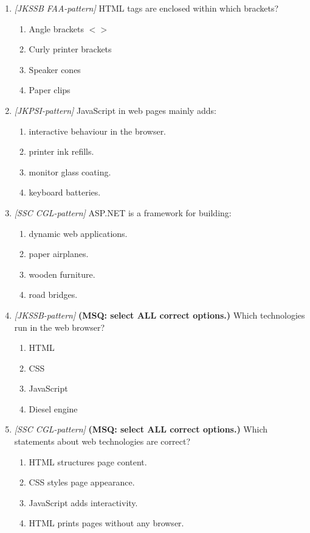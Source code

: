 \begin{enumerate}[label=\textbf{Q\arabic*.}, leftmargin=*]
\item \textit{[JKSSB FAA-pattern]} HTML tags are enclosed within which brackets?
  \begin{enumerate}[label=\Alph*.]
    \item Angle brackets $< >$
    \item Curly printer brackets
    \item Speaker cones
    \item Paper clips
  \end{enumerate}
\item \textit{[JKPSI-pattern]} JavaScript in web pages mainly adds:
  \begin{enumerate}[label=\Alph*.]
    \item interactive behaviour in the browser.
    \item printer ink refills.
    \item monitor glass coating.
    \item keyboard batteries.
  \end{enumerate}
\item \textit{[SSC CGL-pattern]} ASP.NET is a framework for building:
  \begin{enumerate}[label=\Alph*.]
    \item dynamic web applications.
    \item paper airplanes.
    \item wooden furniture.
    \item road bridges.
  \end{enumerate}
\item \textit{[JKSSB-pattern]} \textbf{(MSQ: select ALL correct options.)} Which technologies run in the web browser?
  \begin{enumerate}[label=\Alph*.]
    \item HTML
    \item CSS
    \item JavaScript
    \item Diesel engine
  \end{enumerate}
\item \textit{[SSC CGL-pattern]} \textbf{(MSQ: select ALL correct options.)} Which statements about web technologies are correct?
  \begin{enumerate}[label=\Alph*.]
    \item HTML structures page content.
    \item CSS styles page appearance.
    \item JavaScript adds interactivity.
    \item HTML prints pages without any browser.

\end{enumerate}
\end{enumerate}
